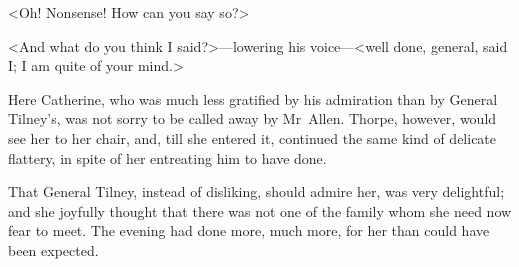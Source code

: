  <Oh! Nonsense! How can you say so?> 

 <And what do you think I said?>—lowering his voice—<well done, general, said I; I am quite of your mind.> 

 Here Catherine, who was much less gratified by his admiration than by General Tilney's, was not sorry to be called away by Mr~Allen. Thorpe, however, would see her to her chair, and, till she entered it, continued the same kind of delicate flattery, in spite of her entreating him to have done. 

 That General Tilney, instead of disliking, should admire her, was very delightful; and she joyfully thought that there was not one of the family whom she need now fear to meet. The evening had done more, much more, for her than could have been expected. 